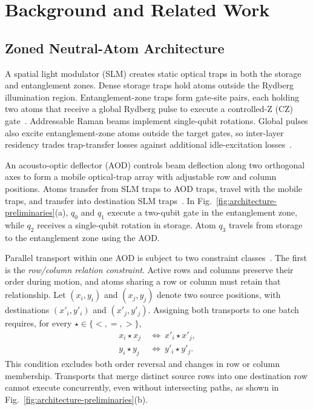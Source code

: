 \section{Background and Related Work}
\label{sec:background}

\subsection{Zoned Neutral-Atom Architecture}

A spatial light modulator (SLM) creates static optical traps in both the storage and entanglement zones. Dense storage traps hold atoms outside the Rydberg illumination region. Entanglement-zone traps form gate-site pairs, each holding two atoms that receive a global Rydberg pulse to execute a controlled-Z (CZ) gate~\cite{evered2023highfidelity,lin2025zac}. Addressable Raman beams implement single-qubit rotations. Global pulses also excite entanglement-zone atoms outside the target gates, so inter-layer residency trades trap-transfer losses against additional idle-excitation losses~\cite{evered2023highfidelity,lin2025zac}.

An acousto-optic deflector (AOD) controls beam deflection along two orthogonal axes to form a mobile optical-trap array with adjustable row and column positions. Atoms transfer from SLM traps to AOD traps, travel with the mobile traps, and transfer into destination SLM traps~\cite{bluvstein2022coherenttransport,lin2025zac}. In Fig.~\ref{fig:architecture-preliminaries}(a), $q_0$ and $q_1$ execute a two-qubit gate in the entanglement zone, while $q_2$ receives a single-qubit rotation in storage. Atom $q_3$ travels from storage to the entanglement zone using the AOD.

Parallel transport within one AOD is subject to two constraint classes~\cite{stade2024abstractmodel,stade2025routingaware}. The first is the \emph{row/column relation constraint}. Active rows and columns preserve their order during motion, and atoms sharing a row or column must retain that relationship. Let $(x_i,y_i)$ and $(x_j,y_j)$ denote two source positions, with destinations $(x'_i,y'_i)$ and $(x'_j,y'_j)$. Assigning both transports to one batch requires, for every $\star\in\{<,=,>\}$,
\begin{equation}
\begin{aligned}
x_i\star x_j&\ \Longleftrightarrow\ x'_i\star x'_j,\\
y_i\star y_j&\ \Longleftrightarrow\ y'_i\star y'_j.
\end{aligned}
\label{eq:aod-relations}
\end{equation}
This condition excludes both order reversal and changes in row or column membership. Transports that merge distinct source rows into one destination row cannot execute concurrently, even without intersecting paths, as shown in Fig.~\ref{fig:architecture-preliminaries}(b).

